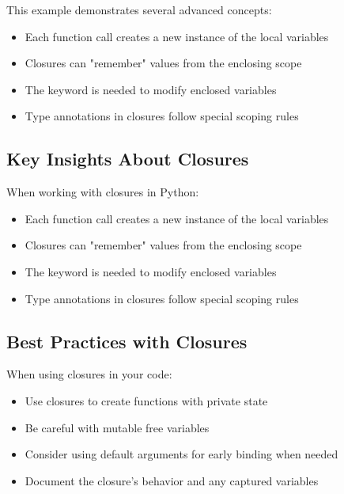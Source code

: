 \begin{macterminal}
    
\end{macterminal}

This example demonstrates several advanced concepts:

\begin{itemize}
    \item Each function call creates a new instance of the local variables
    \item Closures can "remember" values from the enclosing scope  
    \item The  keyword is needed to modify enclosed variables
    \item Type annotations in closures follow special scoping rules
\end{itemize}

\subsection{Key Insights About Closures}

When working with closures in Python:

\begin{itemize}
    \item Each function call creates a new instance of the local variables
    \item Closures can "remember" values from the enclosing scope
    \item The  keyword is needed to modify enclosed variables
    \item Type annotations in closures follow special scoping rules
\end{itemize}

\subsection{Best Practices with Closures}

When using closures in your code:

\begin{itemize}
    \item Use closures to create functions with private state
    \item Be careful with mutable free variables
    \item Consider using default arguments for early binding when needed
    \item Document the closure's behavior and any captured variables
\end{itemize}

